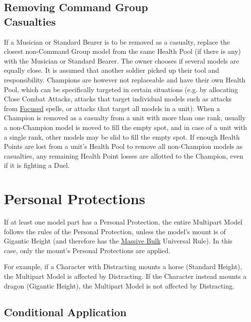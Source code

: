\subsection[Removing Command Group Casualties]{Removing Command Group\\ Casualties}
\label{removing_command_group_casualties}

If a Musician or Standard Bearer is to be removed as a casualty, replace the closest non-Command Group \rnf{} model from the same Health Pool (if there is any) with the Musician or Standard Bearer. The owner chooses if several \rnf{} models are equally close. It is assumed that another soldier picked up their tool and responsibility. Champions are however not replaceable and have their own Health Pool, which can be specifically targeted in certain situations (e.g. by allocating Close Combat Attacks, attacks that target individual models such as attacks from \hyperref[focused]{Focused} spells, or attacks that target all models in a unit). When a Champion is removed as a casualty from a unit with more than one rank, usually a non-Champion \rnf{} model is moved to fill the empty spot, and in case of a unit with a single rank, other models may be slid to fill the empty spot. If enough Health Points are lost from a unit's Health Pool to remove all non-Champion \rnf{} models as casualties, any remaining Health Point losses are allotted to the Champion, even if it is fighting a Duel.

\section{Personal Protections}
\idx[main=y]{\personalprotections}\label{personal_protections}

If at least one model part has a Personal Protection, the entire Multipart Model follows the rules of the Personal Protection, unless the model's mount is of Gigantic Height (and therefore has the \hyperref[massive_bulk]{Massive Bulk} Universal Rule). In this case, only the mount's Personal Protections are applied.

For example, if a Character with Distracting mounts a horse (Standard Height), the Multipart Model is affected by Distracting. If the Character instead mounts a dragon (Gigantic Height), the Multipart Model is not affected by Distracting.

\subsection{Conditional Application}
\label{PP_conditional_application}


